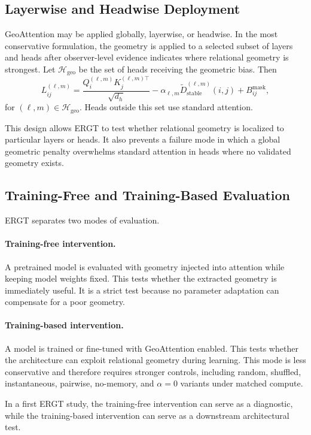 \documentclass[11pt]{article}
\begin{document}
\subsection{Layerwise and Headwise Deployment}

GeoAttention may be applied globally, layerwise, or headwise. In the most conservative formulation, the geometry is applied to a selected subset of layers and heads after observer-level evidence indicates where relational geometry is strongest. Let $\mathcal{H}_{\mathrm{geo}}$ be the set of heads receiving the geometric bias. Then
\[
L_{ij}^{(\ell,m)}
=
\frac{Q_i^{(\ell,m)}K_j^{(\ell,m)\top}}{\sqrt{d_h}}
-
\alpha_{\ell,m}\widetilde{D}_{\mathrm{stable}}^{(\ell,m)}(i,j)
+
B_{ij}^{\mathrm{mask}},
\]
for $(\ell,m)\in\mathcal{H}_{\mathrm{geo}}$. Heads outside this set use standard attention.

This design allows ERGT to test whether relational geometry is localized to particular layers or heads. It also prevents a failure mode in which a global geometric penalty overwhelms standard attention in heads where no validated geometry exists.

\subsection{Training-Free and Training-Based Evaluation}

ERGT separates two modes of evaluation.

\paragraph{Training-free intervention.}
A pretrained model is evaluated with geometry injected into attention while keeping model weights fixed. This tests whether the extracted geometry is immediately useful. It is a strict test because no parameter adaptation can compensate for a poor geometry.

\paragraph{Training-based intervention.}
A model is trained or fine-tuned with GeoAttention enabled. This tests whether the architecture can exploit relational geometry during learning. This mode is less conservative and therefore requires stronger controls, including random, shuffled, instantaneous, pairwise, no-memory, and $\alpha=0$ variants under matched compute.

In a first ERGT study, the training-free intervention can serve as a diagnostic, while the training-based intervention can serve as a downstream architectural test.
\end{document}
